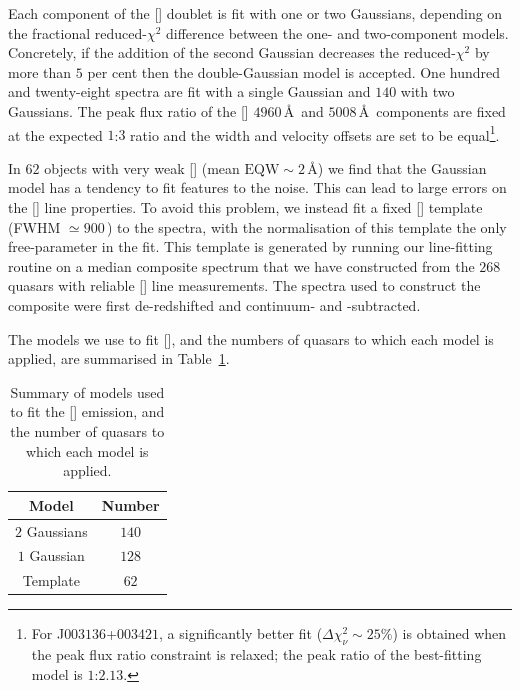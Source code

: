 Each component of the [] doublet is fit with one or two Gaussians, depending on the fractional reduced-$\chi^2$ difference between the one- and two-component models.
Concretely, if the addition of the second Gaussian decreases the reduced-$\chi^2$ by more than $5$ per cent then the double-Gaussian model is accepted.
One hundred and twenty-eight spectra are fit with a single Gaussian and $140$ with two Gaussians.
The peak flux ratio of the [] $4960$\,\AA\, and $5008$\,\AA\, components are fixed at the expected $1$:$3$ ratio and the width and velocity offsets are set to be equal\footnote{For J$003136$+$003421$, a significantly better fit ($\Delta \chi^2_{\nu} \sim 25\%$) is obtained when the peak flux ratio constraint is relaxed; the peak ratio of the best-fitting model is $1$:$2.13$.}.

In $62$ objects with very weak [] (mean $\text{EQW}\sim2$\,\AA) we find that the Gaussian model has a tendency to fit features to the noise.
This can lead to large errors on the [] line properties.
To avoid this problem, we instead fit a fixed [] template (FWHM $\simeq900$\,\kms) to the spectra, with the normalisation of this template the only free-parameter in the fit.
This template is generated by running our line-fitting routine on a median composite spectrum that we have constructed from the $268$ quasars with reliable [] line measurements.
The spectra used to construct the composite were first de-redshifted and continuum- and -subtracted.

The models we use to fit [], and the numbers of quasars to which each model is applied, are summarised in Table~\ref{tab:oiiimod}.

\begin{table}
  \centering
  \footnotesize
    \begin{tabular}{cc}
    \hline
    Model & Number \\
    \hline
    $2$ Gaussians &  $140$ \\
    $1$ Gaussian  &  $128$ \\
    Template &  $62$ \\
    \hline
    \end{tabular}
    \caption[{Summary of models used to fit the [] emission, and the number of quasars to which each model is applied.}]{Summary of models used to fit the [] emission, and the number of quasars to which each model is applied.}
  \label{tab:oiiimod}
\end{table}

